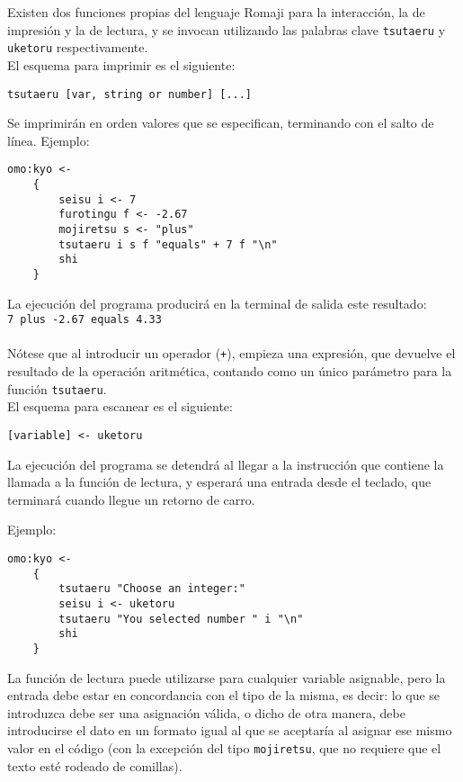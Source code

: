 \documentclass[spanish]{article}
\begin{document}
Existen dos funciones propias del lenguaje Romaji para la interacción, la de impresión y la de lectura, y se invocan utilizando las palabras clave \texttt{tsutaeru} y \texttt{uketoru} respectivamente.\\

El esquema para imprimir es el siguiente:

\begin{lstlisting}[language=Romaji]
    tsutaeru [var, string or number] [...]
\end{lstlisting}
Se imprimirán en orden  valores que se especifican, terminando con el salto de línea. Ejemplo:

\begin{lstlisting}[language=Romaji]
    omo:kyo <- 
    {
        seisu i <- 7
        furotingu f <- -2.67
        mojiretsu s <- "plus"
        tsutaeru i s f "equals" + 7 f "\n"
        shi
    }
\end{lstlisting}
La ejecución del programa producirá en la terminal de salida este resultado:\\

\texttt{7 plus -2.67 equals 4.33}\\
\hspace{0pt}\\
Nótese que al introducir un operador (\texttt{+}), empieza una expresión, que devuelve el resultado de la operación aritmética, contando como un único parámetro para la función \texttt{tsutaeru}.\\

El esquema para escanear es el siguiente:
\begin{lstlisting}[language=Romaji]
    [variable] <- uketoru
\end{lstlisting}
La ejecución del programa se detendrá al llegar a la instrucción que contiene la llamada a la función de lectura, y esperará una entrada desde el teclado, que terminará cuando llegue un retorno de carro.

Ejemplo:
\begin{lstlisting}[language=Romaji]
    omo:kyo <- 
    {
        tsutaeru "Choose an integer:"
        seisu i <- uketoru
        tsutaeru "You selected number " i "\n"
        shi
    }
\end{lstlisting}
La función de lectura puede utilizarse para cualquier variable asignable, pero la entrada debe estar en concordancia con el tipo de la misma, es decir: lo que se introduzca debe ser una asignación válida, o dicho de otra manera, debe introducirse el dato en un formato igual al que se aceptaría al asignar ese mismo valor en el código (con la excepción del tipo \texttt{mojiretsu}, que no requiere que el texto esté rodeado de comillas).
\end{document}
